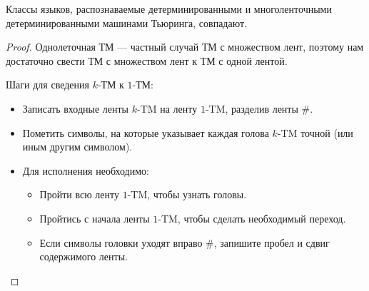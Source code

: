     \begin{Thm}
    Классы языков, распознаваемые детерминированными и многоленточными детерминированными машинами Тьюринга, совпадают.
    \end{Thm}
    \begin{proof}
        \par Однолеточная ТМ --- частный случай ТМ с множеством лент, поэтому нам достаточно свести ТМ с множеством лент к ТМ с одной лентой.
        \par Шаги для сведения $k$-ТМ к $1$-ТМ:
        \begin{itemize}
            \item Записать входные ленты $k$-TM на ленту $1$-TM, разделив ленты \#.
            \item Пометить символы, на которые указывает каждая голова $k$-TM точной (или иным другим символом).
            \item Для исполнения необходимо:
                \begin{itemize}
                    \item Пройти всю ленту $1$-TM, чтобы узнать головы.
                    \item Пройтись с начала ленты $1$-TM, чтобы сделать необходимый переход.
                    \item Если символы головки уходят вправо \#, запишите пробел и сдвиг содержимого ленты.
                \end{itemize}
        \end{itemize}
    \end{proof}

        
